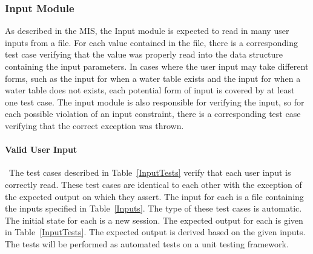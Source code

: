 \documentclass[12pt, titlepage]{article}
\begin{document}
\subsubsection{Input Module}

As described in the MIS, the Input module is expected to read in many user 
inputs from a file. For each value contained in the file, there is a 
corresponding test case verifying that the value was properly read into the 
data structure containing the input parameters. In cases where the user input 
may take different forms, such as the input for when a water table exists and 
the input for when a water table does not exists, each potential form of input 
is covered by at least one test case. The input module is also responsible for 
verifying the input, so for each possible violation of an input constraint, 
there is a corresponding test case verifying that the correct exception was 
thrown.

\paragraph{Valid User Input}

~\newline \noindent The test cases described in Table~\ref{InputTests} 
verify that each user input is correctly read. These test cases are identical 
to each other with the exception of the expected output on which they assert. 
The input for each is a file containing the inputs specified in 
Table~\ref{Inputs}. The type of these test cases is automatic. The initial 
state for each is a new session. The expected output for each is given in 
Table~\ref{InputTests}. The expected output is derived based on the given 
inputs. The tests will be performed as automated tests on a unit testing 
framework.
\end{document}
